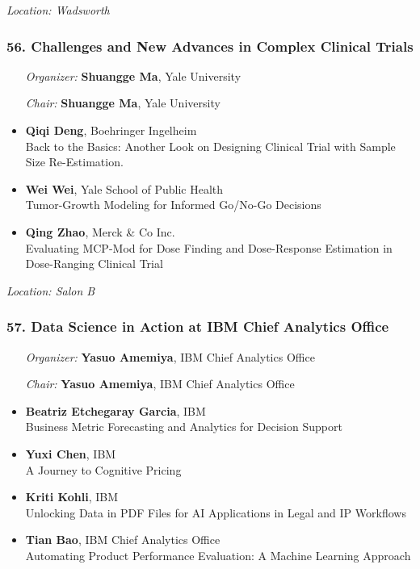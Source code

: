 \emph{Location: Wadsworth}

\subsubsection*{56. Challenges and New Advances in Complex Clinical Trials}

\begin{enumerate}[align=left]
\item [\emph{Organizer:}] \textbf{Shuangge Ma}, Yale University
\item [\emph{Chair:}] \textbf{Shuangge Ma}, Yale University
\end{enumerate}

\begin{itemize}
\item \textbf{Qiqi Deng}, Boehringer Ingelheim \\
Back to the Basics: Another Look on Designing Clinical Trial with Sample Size Re-Estimation.
\item \textbf{Wei Wei}, Yale School of Public Health \\
Tumor-Growth Modeling for Informed Go/No-Go Decisions
\item \textbf{Qing Zhao}, Merck \& Co Inc. \\
Evaluating MCP-Mod for Dose Finding and Dose-Response Estimation in Dose-Ranging Clinical Trial
\end{itemize}

\emph{Location: Salon B}

\subsubsection*{57. Data Science in Action at IBM Chief Analytics Office}

\begin{enumerate}[align=left]
\item [\emph{Organizer:}] \textbf{Yasuo Amemiya}, IBM Chief Analytics Office
\item [\emph{Chair:}] \textbf{Yasuo Amemiya}, IBM Chief Analytics Office
\end{enumerate}

\begin{itemize}
\item \textbf{Beatriz Etchegaray Garcia}, IBM \\
Business Metric Forecasting and Analytics for Decision Support
\item \textbf{Yuxi Chen}, IBM \\
A Journey to Cognitive Pricing
\item \textbf{Kriti Kohli}, IBM \\
Unlocking Data in PDF Files for AI Applications in Legal and IP Workflows
\item \textbf{Tian Bao}, IBM Chief Analytics Office \\
Automating Product Performance Evaluation: A Machine Learning Approach
\end{itemize}

